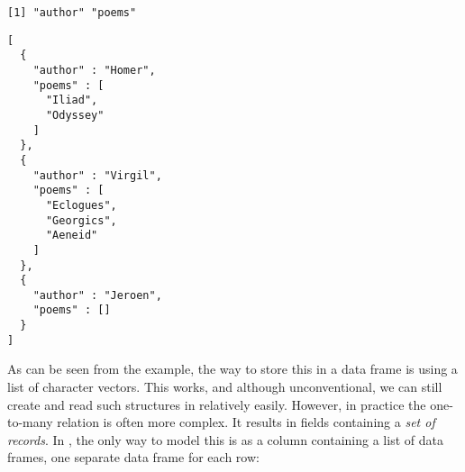 \begin{knitrout}\mycodesize
{}\color{fgcolor}\begin{kframe}
\begin{alltt}
 \hlkwb{<-} \hlstd{(} \hlstd{=} \hlstd{(}\hlstd{,} \hlstd{,} \hlstd{))}
\hlopt{$} \hlkwb{<-} \hlstd{(}\hlstd{(}\hlstd{,} \hlstd{),} \hlstd{(}\hlstd{,} \hlstd{,} \hlstd{),}
  \hlstd{());}
\end{alltt}
\begin{verbatim}
[1] "author" "poems" 
\end{verbatim}
\begin{alltt}
\hlstd{(}  \hlstd{=} \hlstd{))}
\end{alltt}
\begin{verbatim}
[
  {
    "author" : "Homer",
    "poems" : [
      "Iliad",
      "Odyssey"
    ]
  },
  {
    "author" : "Virgil",
    "poems" : [
      "Eclogues",
      "Georgics",
      "Aeneid"
    ]
  },
  {
    "author" : "Jeroen",
    "poems" : []
  }
]
\end{verbatim}
\end{kframe}
\end{knitrout}


 As can be seen from the example, the way to store this in a data frame is using a list of character vectors. This works, and although unconventional, we can still create and read such structures in \R relatively easily. However, in practice the one-to-many relation is often more complex. It results in fields containing a \emph{set of records}. In \R, the only way to model this is as a column containing a list of data frames, one separate data frame for each row:


